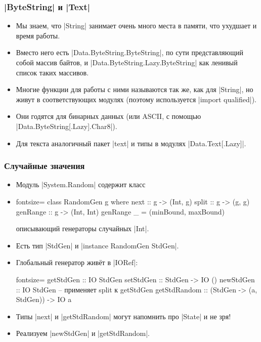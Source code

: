 \documentclass[11pt]{beamer}
\begin{document}
\begin{frame}[fragile]
\frametitle{\haskinline|ByteString| и \haskinline|Text|}
\begin{itemize}
    \item Мы знаем, что \haskinline|String| занимает очень много места в памяти, что ухудшает и время работы.
    \item Вместо него есть \haskinline|Data.ByteString.ByteString|, по сути представляющий собой массив байтов, и \haskinline|Data.ByteString.Lazy.ByteString| как ленивый список таких массивов.
    \item Многие функции для работы с ними называются так же, как для \haskinline|String|, но живут в соответствующих модулях (поэтому используется \haskinline|import qualified|).
    \item Они годятся для бинарных данных (или ASCII, с помощью \haskinline|Data.ByteString[.Lazy].Char8|).
    \item Для текста аналогичный пакет \haskinline|text| и типы в модулях \haskinline|Data.Text[.Lazy]|.
\end{itemize}
\end{frame}

\begin{frame}[fragile]
\frametitle{Случайные значения}
\begin{itemize}
    \item Модуль \haskinline|System.Random| содержит класс
    \item
    \begin{haskell*}{fontsize=\footnotesize}
    class RandomGen g where 
      next :: g -> (Int, g)
      split :: g -> (g, g)
      genRange :: g -> (Int, Int) 
      genRange _ = (minBound, maxBound)
    \end{haskell*}
    описывающий генераторы случайных \haskinline|Int|. 
    \item Есть тип \haskinline|StdGen| и \haskinline|instance RandomGen StdGen|.
    \item Глобальный генератор живёт в \haskinline|IORef|:
    \begin{haskell*}{fontsize=\footnotesize}
    getStdGen :: IO StdGen 
    setStdGen :: StdGen -> IO () 
    newStdGen :: IO StdGen  -- применяет split к getStdGen
    getStdRandom :: (StdGen -> (a, StdGen)) -> IO a 
    \end{haskell*}
    \item Типы \haskinline|next| и \haskinline|getStdRandom| могут напомнить про \haskinline|State| и не зря!
    \item Реализуем \haskinline|newStdGen| и \haskinline|getStdRandom|.
\end{itemize}
\end{frame}
\end{document}
